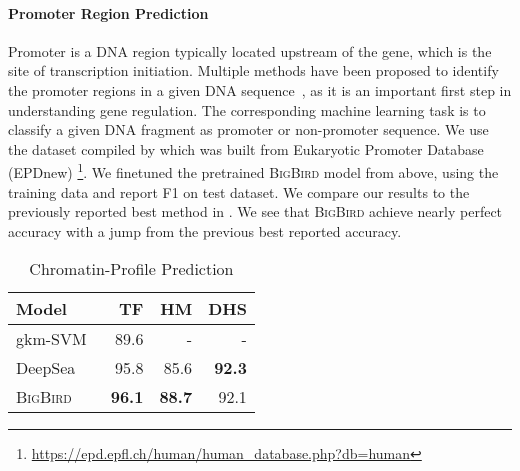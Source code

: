 \documentclass{article}
\newcommand{\bigb}{\textsc{BigBird}\xspace}
\begin{document}
\paragraph{Promoter Region Prediction}
Promoter is a DNA region typically located upstream of the gene, which is the site of transcription initiation.
Multiple methods have been proposed to identify the promoter regions in a given DNA sequence~\citep{yang2017exploiting, lin2017identifying, bharanikumar2018promoterpredict, xiao2019ipsw, oubounyt2019deepromoter}, as it is an important first step in understanding gene regulation.
The corresponding machine learning task is to classify a given DNA fragment as promoter or non-promoter sequence. We use the dataset compiled by \citet{oubounyt2019deepromoter} which was built from Eukaryotic Promoter Database (EPDnew) \citep{dreos2013epd} 
\footnote{ \url{https://epd.epfl.ch/human/human_database.php?db=human}}. 
We finetuned the pretrained \bigb model from above, using the training data and report F1 on test dataset. 
We compare our results to the previously reported best method in .
We see that  
\bigb achieve nearly perfect accuracy with a  jump from the previous best reported accuracy.


\begin{wraptable}{r}{57mm}
    \centering
    \small
    \begin{tabular}{@{}lrrr@{}}
    \toprule
    Model &  TF & HM & DHS \\
    \midrule
    gkm-SVM~\citep{ghandi2014enhanced}  & 89.6 & - & -  \\
    DeepSea~\citep{zhou2015predicting}  & 95.8 & 85.6 & \textbf{92.3} \\
    \midrule
\bigb   & \textbf{96.1} & \textbf{88.7} & 92.1 \\
     \bottomrule
    \end{tabular}
    \caption{Chromatin-Profile Prediction}
    \label{tab:gnve} 
    \vspace{-3mm}
\end{wraptable}
\end{document}

